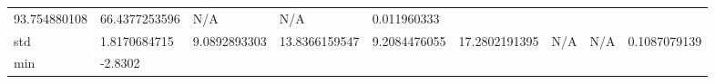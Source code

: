 \begin{longtable}[]{@{}lllllllll@{}}
\begin{minipage}[t]{0.08\columnwidth}
93.754880108\strut
\end{minipage} & \begin{minipage}[t]{0.09\columnwidth}\raggedright
66.4377253596\strut
\end{minipage} & \begin{minipage}[t]{0.09\columnwidth}\raggedright
N/A\strut
\end{minipage} & \begin{minipage}[t]{0.08\columnwidth}\raggedright
N/A\strut
\end{minipage} & \begin{minipage}[t]{0.11\columnwidth}\raggedright
0.011960333\strut
\end{minipage}\tabularnewline
\begin{minipage}[t]{0.05\columnwidth}\raggedright
std\strut
\end{minipage} & \begin{minipage}[t]{0.08\columnwidth}\raggedright
1.8170684715\strut
\end{minipage} & \begin{minipage}[t]{0.09\columnwidth}\raggedright
9.0892893303\strut
\end{minipage} & \begin{minipage}[t]{0.09\columnwidth}\raggedright
13.8366159547\strut
\end{minipage} & \begin{minipage}[t]{0.08\columnwidth}\raggedright
9.2084476055\strut
\end{minipage} & \begin{minipage}[t]{0.09\columnwidth}\raggedright
17.2802191395\strut
\end{minipage} & \begin{minipage}[t]{0.09\columnwidth}\raggedright
N/A\strut
\end{minipage} & \begin{minipage}[t]{0.08\columnwidth}\raggedright
N/A\strut
\end{minipage} & \begin{minipage}[t]{0.11\columnwidth}\raggedright
0.1087079139\strut
\end{minipage}\tabularnewline
\begin{minipage}[t]{0.05\columnwidth}\raggedright
min\strut
\end{minipage} & \begin{minipage}[t]{0.08\columnwidth}\raggedright
-2.8302\strut
\end{minipage} & \begin{minipage}[t]{0.09\columnwidth}\raggedright

\end{minipage}
\end{longtable}
